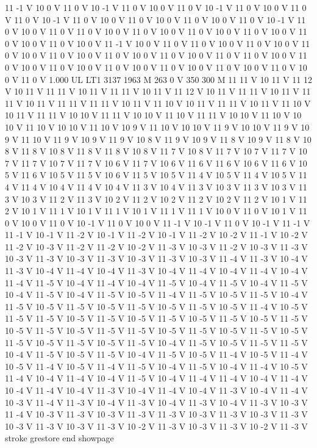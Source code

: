 {11 -1 V
10 0 V
11 0 V
10 -1 V
11 0 V
10 0 V
11 0 V
10 -1 V
11 0 V
10 0 V
11 0 V
11 0 V
10 -1 V
11 0 V
10 0 V
11 0 V
10 0 V
11 0 V
10 0 V
11 0 V
10 -1 V
11 0 V
10 0 V
11 0 V
11 0 V
10 0 V
11 0 V
10 0 V
11 0 V
10 0 V
11 0 V
10 0 V
11 0 V
10 0 V
11 0 V
10 0 V
11 -1 V
10 0 V
11 0 V
11 0 V
10 0 V
11 0 V
10 0 V
11 0 V
10 0 V
11 0 V
10 0 V
11 0 V
10 0 V
11 0 V
10 0 V
11 0 V
11 0 V
10 0 V
11 0 V
10 0 V
11 0 V
10 0 V
11 0 V
10 0 V
11 0 V
10 0 V
11 0 V
10 0 V
11 0 V
10 0 V
11 0 V
1.000 UL
LT1
3137 1963 M
263 0 V
350 300 M
11 11 V
10 11 V
11 12 V
10 11 V
11 11 V
10 11 V
11 11 V
10 11 V
11 12 V
10 11 V
11 11 V
10 11 V
11 11 V
10 11 V
11 11 V
11 11 V
10 11 V
11 10 V
10 11 V
11 11 V
10 11 V
11 10 V
10 11 V
11 11 V
10 10 V
11 11 V
10 10 V
11 10 V
11 11 V
10 10 V
11 10 V
10 10 V
11 10 V
10 10 V
11 10 V
10 9 V
11 10 V
10 10 V
11 9 V
10 10 V
11 9 V
10 9 V
11 10 V
11 9 V
10 9 V
11 9 V
10 8 V
11 9 V
10 9 V
11 8 V
10 9 V
11 8 V
10 8 V
11 8 V
10 8 V
11 8 V
11 8 V
10 8 V
11 7 V
10 8 V
11 7 V
10 7 V
11 7 V
10 7 V
11 7 V
10 7 V
11 7 V
10 6 V
11 7 V
10 6 V
11 6 V
11 6 V
10 6 V
11 6 V
10 5 V
11 6 V
10 5 V
11 5 V
10 6 V
11 5 V
10 5 V
11 4 V
10 5 V
11 4 V
10 5 V
11 4 V
11 4 V
10 4 V
11 4 V
10 4 V
11 3 V
10 4 V
11 3 V
10 3 V
11 3 V
10 3 V
11 3 V
10 3 V
11 2 V
11 3 V
10 2 V
11 2 V
10 2 V
11 2 V
10 2 V
11 2 V
10 1 V
11 2 V
10 1 V
11 1 V
10 1 V
11 1 V
10 1 V
11 1 V
11 1 V
10 0 V
11 0 V
10 1 V
11 0 V
10 0 V
11 0 V
10 -1 V
11 0 V
10 0 V
11 -1 V
10 -1 V
11 0 V
10 -1 V
11 -1 V
11 -1 V
10 -1 V
11 -2 V
10 -1 V
11 -2 V
10 -1 V
11 -2 V
10 -2 V
11 -1 V
10 -2 V
11 -2 V
10 -3 V
11 -2 V
11 -2 V
10 -2 V
11 -3 V
10 -3 V
11 -2 V
10 -3 V
11 -3 V
10 -3 V
11 -3 V
10 -3 V
11 -3 V
10 -3 V
11 -3 V
10 -3 V
11 -4 V
11 -3 V
10 -4 V
11 -3 V
10 -4 V
11 -4 V
10 -4 V
11 -3 V
10 -4 V
11 -4 V
10 -4 V
11 -4 V
10 -4 V
11 -4 V
11 -5 V
10 -4 V
11 -4 V
10 -4 V
11 -5 V
10 -4 V
11 -5 V
10 -4 V
11 -5 V
10 -4 V
11 -5 V
10 -4 V
11 -5 V
10 -5 V
11 -4 V
11 -5 V
10 -5 V
11 -5 V
10 -4 V
11 -5 V
10 -5 V
11 -5 V
10 -5 V
11 -5 V
10 -5 V
11 -5 V
10 -5 V
11 -4 V
10 -5 V
11 -5 V
11 -5 V
10 -5 V
11 -5 V
10 -5 V
11 -5 V
10 -5 V
11 -5 V
10 -5 V
11 -5 V
10 -5 V
11 -5 V
10 -5 V
11 -5 V
11 -5 V
10 -5 V
11 -5 V
10 -5 V
11 -5 V
10 -5 V
11 -5 V
10 -5 V
11 -5 V
10 -5 V
11 -5 V
10 -4 V
11 -5 V
10 -5 V
11 -5 V
11 -5 V
10 -4 V
11 -5 V
10 -5 V
11 -5 V
10 -4 V
11 -5 V
10 -5 V
11 -4 V
10 -5 V
11 -4 V
10 -5 V
11 -4 V
10 -5 V
11 -4 V
11 -5 V
10 -4 V
11 -5 V
10 -4 V
11 -4 V
10 -5 V
11 -4 V
10 -4 V
11 -4 V
10 -4 V
11 -5 V
10 -4 V
11 -4 V
11 -4 V
10 -4 V
11 -4 V
10 -4 V
11 -4 V
10 -4 V
11 -3 V
10 -4 V
11 -4 V
10 -4 V
11 -3 V
10 -4 V
11 -4 V
10 -3 V
11 -4 V
11 -3 V
10 -4 V
11 -3 V
10 -4 V
11 -3 V
10 -4 V
11 -3 V
10 -3 V
11 -4 V
10 -3 V
11 -3 V
10 -3 V
11 -3 V
11 -3 V
10 -3 V
11 -3 V
10 -3 V
11 -3 V
10 -3 V
11 -3 V
10 -3 V
11 -3 V
10 -2 V
11 -3 V
10 -3 V
11 -3 V
10 -2 V
11 -3 V
stroke
grestore
end
showpage
}

